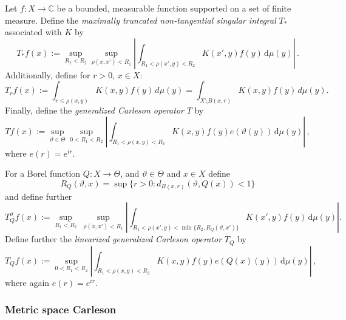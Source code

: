 \documentclass[12pt]{amsart}
\newcommand*{\complex}{\mathbb{C}} %
\theoremstyle{definition}
\theoremstyle{plain}
\newcommand{\tQ}{{Q}}
\newcommand{\mfa}{{\vartheta}}
\newcommand{\Mf}{{\Theta}}
\begin{document}
Let $f\colon X \to \complex$ be a bounded, measurable function supported on a set of finite measure.
Define the \emph{maximally truncated non-tangential singular integral} $T_{*}$ associated with $K$ by
\begin{equation}
    \label{def-tang-unm-op}
    T_{*}f(x):=\sup_{R_1 < R_2} \sup_{\rho(x,x')<R_1} \left|\int_{R_1< \rho(x',y) < R_2} K(x',y) f(y) \, \mathrm{d}\mu(y) \right|\,.
\end{equation}
Additionally, define for $r > 0$, $x\in X$:
\begin{equation}
\label{def-T-r}
T_r f(x):= \int_{r\le\rho(x,y)} K(x,y) f(y) \, d\mu(y) = \int_{X\setminus B(x,r)} K(x,y) f(y) \, d\mu(y).
\end{equation}
Finally, define the \emph{generalized Carleson operator} $T$ by
\begin{equation}
    \label{def-main-op}
    Tf(x):=\sup_{\mfa\in\Mf} \sup_{0 < R_1 < R_2}\left| \int_{R_1 < \rho(x,y) < R_2} K(x,y) f(y) e(\mfa(y)) \, \mathrm{d}\mu(y) \right|\, ,
\end{equation}
where $e(r)=e^{ir}$.

For a Borel function $\tQ:X\to \Mf$, and $\mfa \in \Mf$ and $x\in X$ define
\begin{equation}
    R_{\tQ}(\mfa,x)=\sup\{r>0:d_{B(x,r)}(\mfa, \tQ(x))<1\}
\end{equation}
and define further
\begin{equation}
    \label{def-lin-star-op}
    T_{\tQ}^\mfa f(x):=\sup_{R_1<R_2} \ \sup_{\rho(x,x')<R_1}
    \left|\int_{R_1< \rho(x',y) < \min\{R_2, R_{\tQ}(\mfa,x')\}} K(x',y) f(y) \, \mathrm{d}\mu(y) \right|.
\end{equation}
Define further the \emph{linearized generalized Carleson operator} $T_\tQ$ by
\begin{equation}
    \label{def-lin-main-op}
    T_\tQ f(x):= \sup_{0 < R_1 < R_2}\left| \int_{R_1 < \rho(x,y) < R_2} K(x,y) f(y) e(\tQ(x)(y)) \, \mathrm{d}\mu(y) \right|\, ,
\end{equation}
where again $e(r)=e^{ir}$.

\subsubsection{Metric space Carleson}\label{subsubsec:metric-carleson}
\end{document}
